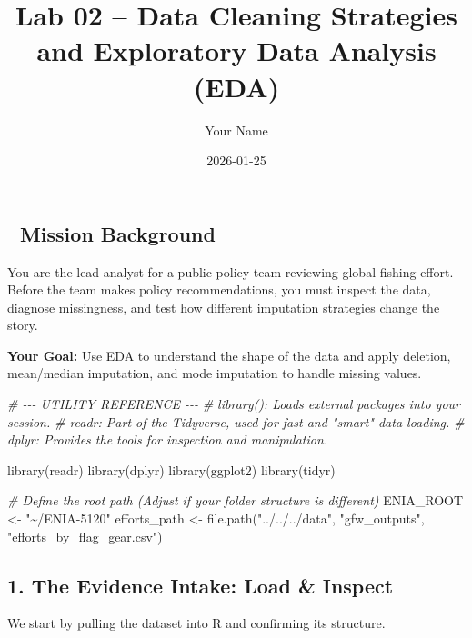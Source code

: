 \documentclass[
]{article}
\title{Lab 02 -- Data Cleaning Strategies and Exploratory Data Analysis
(EDA)}
\author{Your Name}
\date{2026-01-25}
\newenvironment{Shaded}{\begin{snugshade}}{\end{snugshade}}
\newcommand{\CommentTok}[1]{\textcolor[rgb]{0.56,0.35,0.01}{\textit{#1}}}
\newcommand{\FunctionTok}[1]{\textcolor[rgb]{0.00,0.00,0.00}{#1}}
\newcommand{\NormalTok}[1]{#1}
\newcommand{\OtherTok}[1]{\textcolor[rgb]{0.56,0.35,0.01}{#1}}
\newcommand{\StringTok}[1]{\textcolor[rgb]{0.31,0.60,0.02}{#1}}
\begin{document}
\maketitle

{
\setcounter{tocdepth}{2}
\tableofcontents
}
\hypertarget{mission-background}{%
\subsection{🧭 Mission Background}\label{mission-background}}

You are the lead analyst for a public policy team reviewing global
fishing effort. Before the team makes policy recommendations, you must
inspect the data, diagnose missingness, and test how different
imputation strategies change the story.

\textbf{Your Goal:} Use EDA to understand the shape of the data and
apply deletion, mean/median imputation, and mode imputation to handle
missing values.

\begin{Shaded}
\begin{Highlighting}[]
\CommentTok{\# {-}{-}{-} UTILITY REFERENCE {-}{-}{-}}
\CommentTok{\# library(): Loads external packages into your session.}
\CommentTok{\# readr: Part of the Tidyverse, used for fast and "smart" data loading.}
\CommentTok{\# dplyr: Provides the tools for inspection and manipulation.}

\FunctionTok{library}\NormalTok{(readr)}
\FunctionTok{library}\NormalTok{(dplyr)}
\FunctionTok{library}\NormalTok{(ggplot2)}
\FunctionTok{library}\NormalTok{(tidyr)}

\CommentTok{\# Define the root path (Adjust if your folder structure is different)}
\NormalTok{ENIA\_ROOT }\OtherTok{\textless{}{-}} \StringTok{"\textasciitilde{}/ENIA{-}5120"}
\NormalTok{efforts\_path }\OtherTok{\textless{}{-}} \FunctionTok{file.path}\NormalTok{(}\StringTok{"../../../data"}\NormalTok{, }\StringTok{"gfw\_outputs"}\NormalTok{, }\StringTok{"efforts\_by\_flag\_gear.csv"}\NormalTok{)}
\end{Highlighting}
\end{Shaded}

\hypertarget{the-evidence-intake-load-inspect}{%
\subsection{1. The Evidence Intake: Load \&
Inspect}\label{the-evidence-intake-load-inspect}}

We start by pulling the dataset into R and confirming its structure.
\end{document}
